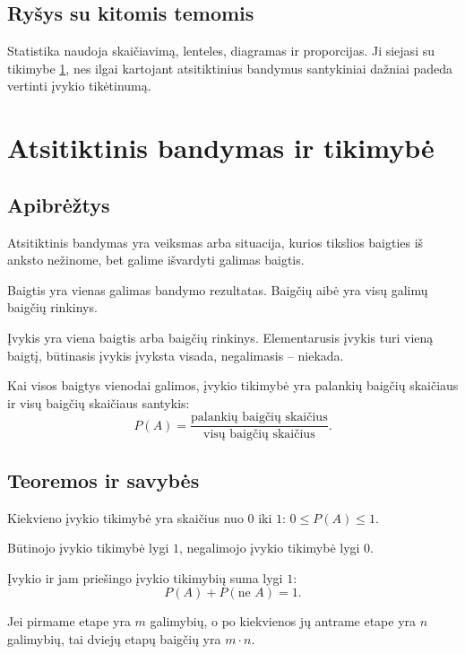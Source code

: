 \subsection{Ryšys su kitomis temomis}
Statistika naudoja skaičiavimą, lenteles, diagramas ir proporcijas. Ji siejasi su tikimybe \ref{sec:atsitiktiniai-bandymas-ir-tikimybe}, nes ilgai kartojant atsitiktinius bandymus santykiniai dažniai padeda vertinti įvykio tikėtinumą.

\section{Atsitiktinis bandymas ir tikimybė}\label{sec:atsitiktiniai-bandymas-ir-tikimybe}

\subsection{Apibrėžtys}
\begin{apibreztis}
Atsitiktinis bandymas yra veiksmas arba situacija, kurios tikslios baigties iš anksto nežinome, bet galime išvardyti galimas baigtis.
\end{apibreztis}
\begin{apibreztis}
Baigtis yra vienas galimas bandymo rezultatas. Baigčių aibė yra visų galimų baigčių rinkinys.
\end{apibreztis}
\begin{apibreztis}
Įvykis yra viena baigtis arba baigčių rinkinys. Elementarusis įvykis turi vieną baigtį, būtinasis įvykis įvyksta visada, negalimasis -- niekada.
\end{apibreztis}
\begin{apibreztis}
Kai visos baigtys vienodai galimos, įvykio tikimybė yra palankių baigčių skaičiaus ir visų baigčių skaičiaus santykis:
\[
P(A)=\frac{\text{palankių baigčių skaičius}}{\text{visų baigčių skaičius}}.
\]
\end{apibreztis}

\subsection{Teoremos ir savybės}
\begin{savybe}
Kiekvieno įvykio tikimybė yra skaičius nuo \(0\) iki \(1\): \(0\le P(A)\le 1\).
\end{savybe}
\begin{savybe}
Būtinojo įvykio tikimybė lygi \(1\), negalimojo įvykio tikimybė lygi \(0\).
\end{savybe}
\begin{savybe}
Įvykio ir jam priešingo įvykio tikimybių suma lygi \(1\):
\[
P(A)+P(\text{ne }A)=1.
\]
\end{savybe}
\begin{savybe}
Jei pirmame etape yra \(m\) galimybių, o po kiekvienos jų antrame etape yra \(n\) galimybių, tai dviejų etapų baigčių yra \(m\cdot n\).
\end{savybe}

